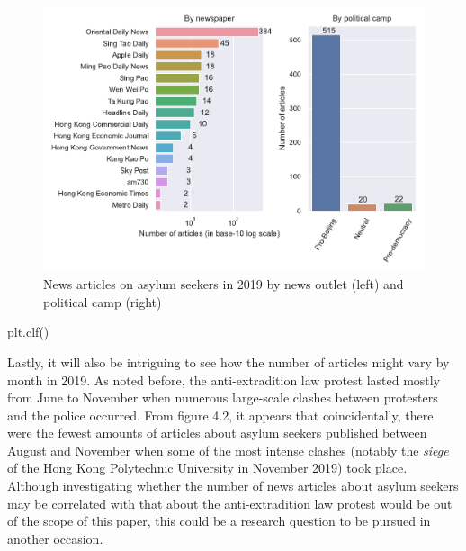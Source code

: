 \documentclass[a4paper, oneside]{report}
\newenvironment{Shaded}{\begin{snugshade}}{\end{snugshade}}
\newcommand{\NormalTok}[1]{#1}
\renewenvironment{Shaded}
{
  \vspace{4pt}%
  \begin{snugshade}%
}{%
  \end{snugshade}%
  \vspace{4pt}%
}
\begin{document}
\begin{figure}
\centering
\includegraphics{versions/Chin_Chapter_4_2022-01-10_files/figure-latex/unnamed-chunk-1-1.pdf}
\caption{News articles on asylum seekers in 2019 by news outlet (left)
and political camp (right)}
\end{figure}

\begin{Shaded}
\begin{Highlighting}[]
\NormalTok{plt.clf()}
\end{Highlighting}
\end{Shaded}

Lastly, it will also be intriguing to see how the number of articles
might vary by month in 2019. As noted before, the anti-extradition law
protest lasted mostly from June to November when numerous large-scale
clashes between protesters and the police occurred. From figure 4.2, it
appears that coincidentally, there were the fewest amounts of articles
about asylum seekers published between August and November when some of
the most intense clashes (notably the \emph{siege} of the Hong Kong
Polytechnic University in November 2019) took place. Although
investigating whether the number of news articles about asylum seekers
may be correlated with that about the anti-extradition law protest would
be out of the scope of this paper, this could be a research question to
be pursued in another occasion.
\end{document}
